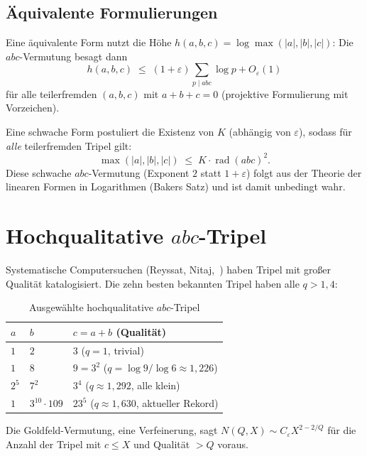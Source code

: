 \documentclass[12pt,a4paper]{article}
\theoremstyle{remark}
\begin{document}
\subsection{Äquivalente Formulierungen}

Eine äquivalente Form nutzt die Höhe $h(a,b,c) = \log\max(|a|,|b|,|c|)$: Die
$abc$-Vermutung besagt dann
\[
  h(a,b,c) \;\leq\; (1+\varepsilon)\sum_{p\mid abc} \log p + O_\varepsilon(1)
\]
für alle teilerfremden $(a,b,c)$ mit $a+b+c=0$ (projektive Formulierung mit Vorzeichen).

Eine schwache Form postuliert die Existenz von $K$ (abhängig von $\varepsilon$), sodass
für \emph{alle} teilerfremden Tripel gilt:
\[
  \max(|a|,|b|,|c|) \;\leq\; K \cdot \operatorname{rad}(abc)^2.
\]
Diese schwache $abc$-Vermutung (Exponent $2$ statt $1+\varepsilon$) folgt aus der Theorie
der linearen Formen in Logarithmen (Bakers Satz) und ist damit unbedingt wahr.

\section{Hochqualitative $abc$-Tripel}

Systematische Computersuchen (Reyssat, Nitaj,~\cite{Nitaj1996}) haben Tripel mit großer
Qualität katalogisiert. Die zehn besten bekannten Tripel haben alle $q > 1{,}4$:

\begin{table}[h]
\centering
\begin{tabular}{lll}
\toprule
$a$ & $b$ & $c = a+b$ \quad (Qualität) \\
\midrule
$1$ & $2$ & $3$ \quad ($q=1$, trivial) \\
$1$ & $8$ & $9 = 3^2$ \quad ($q = \log 9/\log 6 \approx 1{,}226$) \\
$2^5$ & $7^2$ & $3^4$ \quad ($q\approx1{,}292$, alle klein) \\
$1$ & $3^{10}\!\cdot\!109$ & $23^5$ \quad ($q\approx1{,}630$, aktueller Rekord) \\
\bottomrule
\end{tabular}
\caption{Ausgewählte hochqualitative $abc$-Tripel}
\end{table}

Die Goldfeld-Vermutung, eine Verfeinerung, sagt $N(Q,X) \sim C_\varepsilon X^{2-2/Q}$
für die Anzahl der Tripel mit $c\leq X$ und Qualität $>Q$ voraus.
\end{document}
